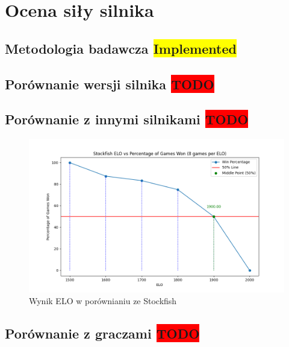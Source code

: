 
\chapter {Ocena siły silnika}
\label {ch: ocena-sily-silnika}

\section {Metodologia badawcza \colorbox{yellow}{Implemented}}
\label {sec: metodologia-badawcza}

\section {Porównanie wersji silnika \colorbox{red}{TODO}}
\label {sec: porownanie-wersji-silnika}

\section {Porównanie z innymi silnikami \colorbox{red}{TODO}}
\label {sec: porownianie-z-silnikami}

\begin{figure}[ht]
    \centering
    \includegraphics[width=1\linewidth]{rozdzialy/rozdzial03/rysunki/elo_chart}
    \caption{Wynik ELO w porównianiu ze Stockfish}
    \label{fig:elo}
\end{figure}

\section {Porównanie z graczami \colorbox{red}{TODO}}
\label {sec: porownanie-z-graczami}

